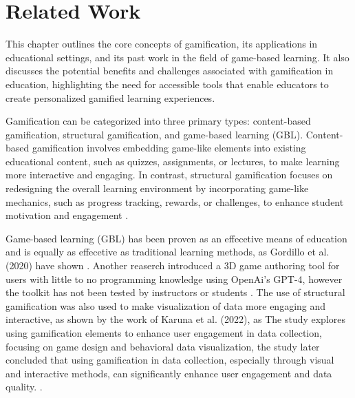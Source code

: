 \chapter{Related Work}\label{chap:relatedwork}
This chapter outlines the core concepts of gamification, its applications in educational settings, and its past work in the field of game-based learning. It also discusses the potential benefits and challenges associated with gamification in education, highlighting the need for accessible tools that enable educators to create personalized gamified learning experiences.

Gamification can be categorized into three primary types: content-based gamification, structural gamification, and game-based learning (GBL). Content-based gamification involves embedding game-like elements into existing educational content, such as quizzes, assignments, or lectures, to make learning more interactive and engaging. In contrast, structural gamification focuses on redesigning the overall learning environment by incorporating game-like mechanics, such as progress tracking, rewards, or challenges, to enhance student motivation and engagement \cite{fernando2024}.

Game-based learning (GBL) has been proven as an effecetive means of education and is equally as effecetive as traditional learning methods, as Gordillo et al. (2020) have shown \cite{sgame2020}. Another reaserch introduced a 3D game authoring tool for users with little to no programming knowledge using OpenAi's GPT-4, however the toolkit has not been tested by instructors or students \cite{horn2023}. The use of structural gamification was also used to make visualization of data more engaging and interactive, as shown by the work of Karuna et al. (2022), as The study explores using gamification elements to enhance user engagement in data collection, focusing on game design and behavioral data visualization, the study later  concluded that using gamification in data collection, especially through visual and interactive methods, can significantly enhance user engagement and data quality. \cite{karuna2019}.

